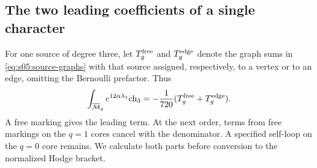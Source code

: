 \subsection{The two leading coefficients of a single character}
\label{subsec:s05:02}

For one source of degree three, let $T_g^{\rm free}$ and
$T_g^{\rm edge}$ denote the graph sums in
\eqref{eq:s05:source-graphs} with that source assigned, respectively,
to a vertex or to an edge, omitting the Bernoulli prefactor. Thus
\begin{equation}\label{eq:s05:single-source}
 \int_{\overline{\mathcal{M}}_g}e^{12\alpha\lambda_1}\mathrm{ch}_3
       =-\frac1{720}(T_g^{\rm free}+T_g^{\rm edge}).
\end{equation}
A free marking gives the leading term. At the next order, terms
from free markings on the $q=1$ cores cancel with the denominator.
A specified self-loop on the $q=0$ core remains. We calculate both
parts before conversion to the normalized Hodge bracket.

